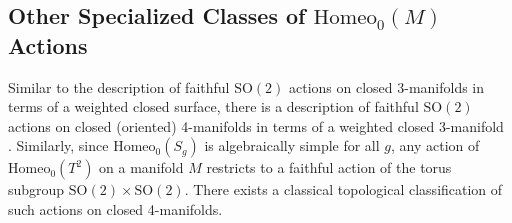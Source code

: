 \documentclass[10pt, oneside]{article}
\newcommand{\SO}[1][2]{\text{SO}(#1)}
\newcommand{\homeo}[1][S^1]{\text{Homeo}_0(#1)}
\newcommand{\cl}[1]{\overline{#1}}
\newcommand{\pconf}[2][S^1]{\text{PConf}_{#2}(#1)}
\theoremstyle{definition}
\theoremstyle{definition}
\begin{document}



\subsection{Other Specialized Classes of \texorpdfstring{$\homeo[M]$}{Homeo\_0(M)} Actions}

Similar to the description of faithful $\SO$ actions on closed 3-manifolds in terms of a weighted closed surface, there is a description of faithful $\SO$ actions on closed (oriented) 4-manifolds in terms of a weighted closed 3-manifold \cite{fintushel:ClassificationCircle}\cite{jang:CircleActions}. Similarly, since $\homeo[S_g]$ is algebraically simple for all $g$\cite{bounemoura:SimpliciteGroupes}, any action of $\homeo[T^2]$ on a manifold $M$ restricts to a faithful action of the torus subgroup $\SO\times\SO$. There exists a classical topological classification of such actions on closed 4-manifolds\cite{orlik:ActionsTorusI, orlik:ActionsTorusII}.

\printbibliography
\end{document}
